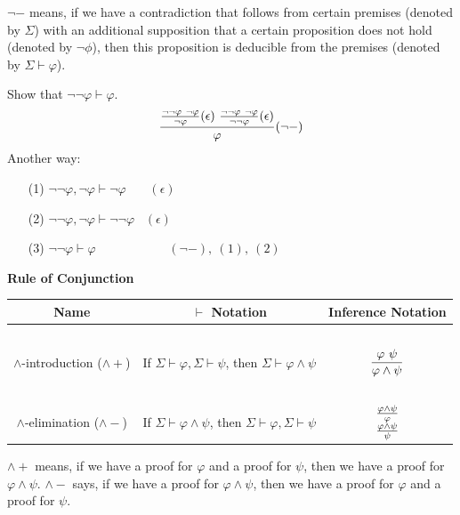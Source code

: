 \documentclass[english, 11pt]{article}
\begin{document}
\begin{defn}
    $\neg -$ means, if we have a contradiction that follows from certain premises (denoted by $\Sigma$) with an additional supposition that a certain proposition does not hold (denoted by $\neg \phi$), then this proposition is deducible from the premises (denoted by $\Sigma \vdash \varphi$).

    \begin{exmp}
      Show that $\neg \neg \varphi \vdash \varphi$.
      \[ \f{\f{\neg\neg\varphi \ \neg\varphi}{\neg\varphi}(\epsilon) \ \f{\neg\neg\varphi \ \neg \varphi}{\neg\neg\varphi}(\epsilon)}{\varphi}(\neg -) \]
      Another way:
      \begin{itemize}
        \item[(1)] $\neg \neg \varphi, \neg \varphi \vdash \neg \varphi$ \ \ \ $(\epsilon)$
        \item[(2)] $\neg \neg \varphi, \neg \varphi \vdash \neg \neg \varphi$ \ $(\epsilon)$
        \item[(3)] $\neg \neg \varphi \vdash \varphi$ \ \ \ \ \ \ \ \ \ \ \  $(\neg -), \ (1), \ (2)$
      \end{itemize}
    \end{exmp}

    \begin{center}\textbf{Rule of Conjunction}\end{center}

    \begin{center}
    \begin{tabular}{c | c | c }
      Name & $\vdash$ Notation & Inference Notation \\
      \hline
      \hline
      \ &&\\
      $\land$-introduction ($\land+$) & If $\Sigma \vdash \varphi, \Sigma \vdash \psi$, then $\Sigma \vdash \varphi \land \psi$ & $\displaystyle\frac{\varphi \ \psi}{\varphi \land \psi}$ \\[3ex]
      \hline
      \hline
      \ &&\\
      $\land$-elimination ($\land-$) & If $\Sigma \vdash \varphi \land \psi$, then $\Sigma \vdash \varphi, \Sigma \vdash \psi$ & $\displaystyle\begin{array}{c}\frac{\varphi \land \psi}{\varphi} \\ \frac{\varphi \land \psi}{\psi}\end{array}$ \\[3ex]
      \hline
      \hline
    \end{tabular}
    \end{center}
    $\land+$ means, if we have a proof for $\varphi$ and a proof for $\psi$, then we have a proof for $\varphi \land \psi$. $\land -$ says, if we have a proof for $\varphi \land \psi$, then we have a proof for $\varphi$ and a proof for $\psi$.


\end{defn}
\end{document}
